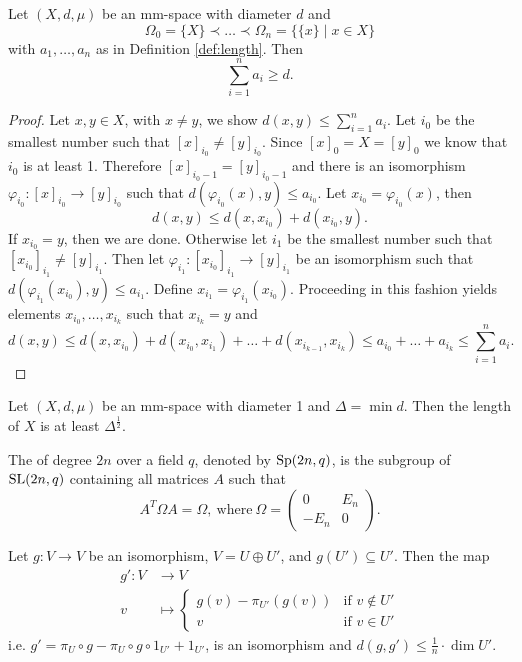 \begin{lemma}
Let $(X,d,\mu)$ be an mm-space with diameter $d$ and 
\[\Omega_0=\{X\}\prec\dots\prec\Omega_n=\{\{x\}\mid x\in X\}\]
with $a_1,\dots,a_n$ as in Definition \ref{def:length}. Then 
\[\sum_{i=1}^{n}a_i\geq d.\]
\end{lemma}
\begin{proof}
Let $x,y\in X$, with $x\neq y$, we show $d(x,y)\leq\sum_{i=1}^{n}a_i$. Let $i_0$ be the smallest number such that $[x]_{i_0}\neq [y]_{i_0}$. Since $[x]_0=X=[y]_0$ we know that $i_0$ is at least 1. Therefore $[x]_{i_0-1}=[y]_{i_0-1}$ and there is an isomorphism $\varphi_{i_0}\colon[x]_{i_0}\to[y]_{i_0}$ such that $d(\varphi_{i_0}(x),y)\leq a_{i_0}$. Let $x_{i_0}=\varphi_{i_0}(x)$, then 
\[d(x,y)\leq d(x,x_{i_0})+d(x_{i_0},y).\]
If $x_{i_0}=y$, then we are done. Otherwise let $i_1$ be the smallest number such that $[x_{i_0}]_{i_1}\neq [y]_{i_1}$. Then let $\varphi_{i_1}\colon[x_{i_0}]_{i_1}\to[y]_{i_1}$ be an isomorphism such that $d(\varphi_{i_1}(x_{i_0}),y)\leq a_{i_1}$. Define $x_{i_1}=\varphi_{i_1}(x_{i_0})$. Proceeding in this fashion yields elements $x_{i_0},\dots,x_{i_k}$ such that $x_{i_k}=y$ and
\[d(x,y)\leq d(x,x_{i_0})+d(x_{i_0},x_{i_1})+\dots+d(x_{i_{k-1}},x_{i_k})\leq a_{i_0}+\dots +a_{i_k}\leq\sum_{i=1}^{n}a_i.\] 
\end{proof}

\begin{lemma}
Let $(X,d,\mu)$ be an mm-space with diameter 1 and $\Delta=\min d$. Then the length of $X$ is at least $\Delta^{\frac{1}{2}}$.
\end{lemma}

\begin{definition}
The  of degree $2n$ over a field $q$, denoted by $\operatorname{Sp}(2n,q)$, is the subgroup of $\operatorname{SL}(2n,q)$ containing all matrices $A$ such that
\[A^T\Omega A=\Omega,\ \text{where}\ \Omega=\left(\begin{array}{cc}
0&E_n\\
-E_n&0
\end{array}\right).\]
\end{definition}

\begin{lemma} %
Let $g\colon V\to V$ be an isomorphism, $V=U\oplus U'$, and $g(U')\subseteq U'$. %
Then the map 
\begin{align*}
g'\colon V&\to V\\
v&\mapsto
\begin{cases}
g(v)-\pi_{U'}(g(v)) &\text{if }v\notin U'\\
v &\text{if }v\in U'
\end{cases}
\end{align*}
i.e. $g'=\pi_U\circ g-\pi_U\circ g \circ1_{U'} +1_{U'}$, is an isomorphism and $d(g,g')\leq \frac{1}{n}\cdot\dim U'$.
\end{lemma}

